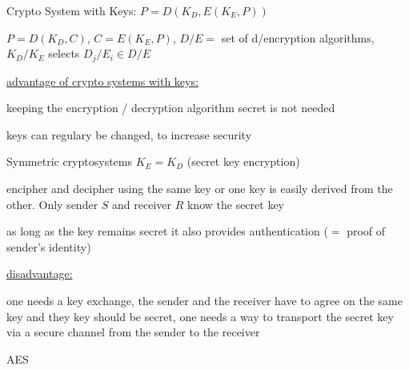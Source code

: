 \documentclass[landscape, a4paper]{article}
\begin{document}
\begin{minipage}[t]{0.198\pagewidth}
	\begin{betterlist}
		\item \alert{Crypto System with Keys:} $P = D(K_D, E(K_E, P))$
		\begin{betterlist}
			\item $P = D(K_D, C)$, $C = E(K_E, P)$, $D/E =$ set of d/encryption algorithms, $K_D/K_E$ selects $D_j/E_i \in D/E$
		\end{betterlist}
		\begin{betterlist}
			\item \underline{advantage of crypto systems with keys:}
			\begin{betterlist}
				\item keeping the encryption / decryption algorithm secret is not needed
				\item keys can regulary be changed, to increase security
			\end{betterlist}
		\end{betterlist}
	\end{betterlist}
	\begin{betterlist}
		\item \alert{Symmetric cryptosystems} $K_E = K_D$ (secret key encryption)
		\begin{betterlist}
			\item encipher and decipher using the same key or one key is easily derived from the other. Only sender $S$ and receiver $R$ know the \alert{secret key}
			\item as long as the key remains secret it also provides \alert{authentication} ($=$ proof of sender’s identity)
			\item \underline{disadvantage:}
			\begin{betterlist}
				\item one needs a \alert{key exchange}, the sender and the receiver have to agree on the same key and they key should be secret, one needs a way to transport the secret key via a secure channel from the sender to the receiver
			\end{betterlist}
			\item \alert{AES}
		\end{betterlist}
	\end{betterlist}

\end{minipage}
\end{document}
